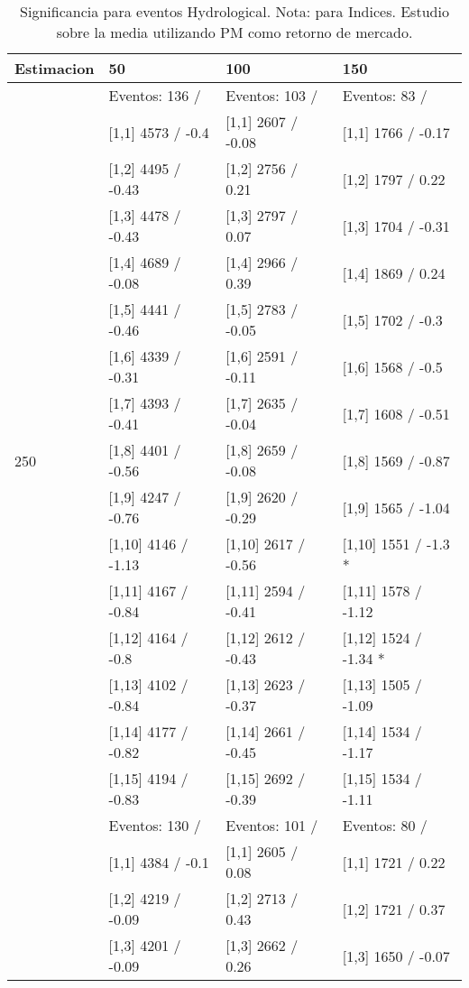\begin{table}

\caption{Significancia para eventos Hydrological. Nota: para Indices. Estudio sobre la media utilizando PM como retorno de mercado.}
\centering
\begin{tabular}[t]{llll}
\toprule
Estimacion & 50 & 100 & 150\\
\midrule
 & Eventos:  136 / & Eventos:  103 / & Eventos:  83 /\\
 & {}[1,1] 4573  / -0.4 & {}[1,1] 2607  / -0.08 & {}[1,1] 1766  / -0.17\\
 & {}[1,2] 4495  / -0.43 & {}[1,2] 2756  / 0.21 & {}[1,2] 1797  / 0.22\\
 & {}[1,3] 4478  / -0.43 & {}[1,3] 2797  / 0.07 & {}[1,3] 1704  / -0.31\\
 & {}[1,4] 4689  / -0.08 & {}[1,4] 2966  / 0.39 & {}[1,4] 1869  / 0.24\\
\addlinespace
 & {}[1,5] 4441  / -0.46 & {}[1,5] 2783  / -0.05 & {}[1,5] 1702  / -0.3\\
 & {}[1,6] 4339  / -0.31 & {}[1,6] 2591  / -0.11 & {}[1,6] 1568  / -0.5\\
 & {}[1,7] 4393  / -0.41 & {}[1,7] 2635  / -0.04 & {}[1,7] 1608  / -0.51\\
250 & {}[1,8] 4401  / -0.56 & {}[1,8] 2659  / -0.08 & {}[1,8] 1569  / -0.87\\
 & {}[1,9] 4247  / -0.76 & {}[1,9] 2620  / -0.29 & {}[1,9] 1565  / -1.04\\
\addlinespace
 & {}[1,10] 4146  / -1.13 & {}[1,10] 2617  / -0.56 & {}[1,10] 1551  / -1.3 *\\
 & {}[1,11] 4167  / -0.84 & {}[1,11] 2594  / -0.41 & {}[1,11] 1578  / -1.12\\
 & {}[1,12] 4164  / -0.8 & {}[1,12] 2612  / -0.43 & {}[1,12] 1524  / -1.34 *\\
 & {}[1,13] 4102  / -0.84 & {}[1,13] 2623  / -0.37 & {}[1,13] 1505  / -1.09\\
 & {}[1,14] 4177  / -0.82 & {}[1,14] 2661  / -0.45 & {}[1,14] 1534  / -1.17\\
\addlinespace
 & {}[1,15] 4194  / -0.83 & {}[1,15] 2692  / -0.39 & {}[1,15] 1534  / -1.11\\
 & Eventos:  130 / & Eventos:  101 / & Eventos:  80 /\\
 & {}[1,1] 4384  / -0.1 & {}[1,1] 2605  / 0.08 & {}[1,1] 1721  / 0.22\\
 & {}[1,2] 4219  / -0.09 & {}[1,2] 2713  / 0.43 & {}[1,2] 1721  / 0.37\\
 & {}[1,3] 4201  / -0.09 & {}[1,3] 2662  / 0.26 & {}[1,3] 1650  / -0.07\\

\end{tabular}
\end{table}
